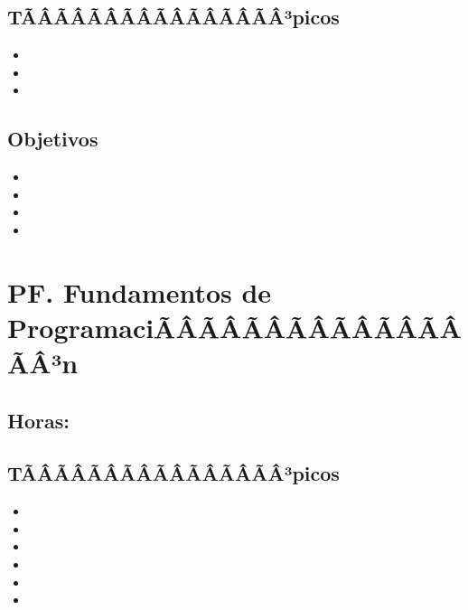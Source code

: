 \subsection*{TÃÂÃÂÃÂÃÂÃÂÃÂÃÂÃÂ³picos}
\begin{itemize}
	\item \DSSEISTopicEspacios
	\item \DSSEISTopicProbabilidad
	\item \DSSEISTopicVariables
\end{itemize}

\subsection*{Objetivos}
\begin{itemize}
	\item \DSSEISObjUNO
	\item \DSSEISObjDOS
	\item \DSSEISObjTRES
	\item \DSSEISObjCUATRO
\end{itemize}

\section{PF. Fundamentos de ProgramaciÃÂÃÂÃÂÃÂÃÂÃÂÃÂÃÂ³n}\label{sec:BOK-PF}

\subsection{\PFUNODef}\label{sec:BOK-PF1}
\subsection*{Horas: \PFUNOHours}

\subsection*{TÃÂÃÂÃÂÃÂÃÂÃÂÃÂÃÂ³picos}
\begin{itemize}
	\item \PFUNOTopicSintaxis
	\item \PFUNOTopicVariables
	\item \PFUNOTopicEntrada
	\item \PFUNOTopicEstructuras
	\item \PFUNOTopicFunciones
	\item \PFUNOTopicDescomposicion
\end{itemize}

